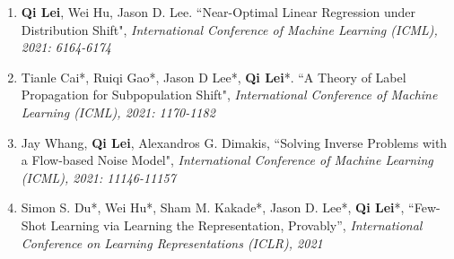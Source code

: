 \documentclass[margin, 10pt]{res} %
\begin{document}
\begin{resume}
\begin{enumerate}
	
\item{ \textbf{Qi Lei}, Wei Hu, Jason D. Lee.	
``Near-Optimal Linear Regression under Distribution Shift", \textit{ International Conference of Machine Learning (ICML), 2021: 6164-6174}
}	
\item{Tianle Cai*, Ruiqi Gao*, Jason D Lee*, \textbf{Qi Lei}*.  ``A Theory of Label Propagation for Subpopulation Shift", \textit{International Conference of Machine Learning (ICML), 2021: 1170-1182
} }
\item{Jay Whang, \textbf{Qi Lei}, Alexandros G. Dimakis, ``Solving Inverse Problems with a Flow-based Noise Model", \textit{International Conference of Machine Learning (ICML), 2021: 11146-11157
 }}
	\item{Simon S. Du*, Wei Hu*, Sham M. Kakade*, Jason D. Lee*, \textbf{Qi Lei}*, ``Few-Shot Learning via Learning the Representation, Provably'', \textit{International Conference on Learning Representations (ICLR), 2021} }
	

\end{enumerate}
\end{resume}
\end{document}
